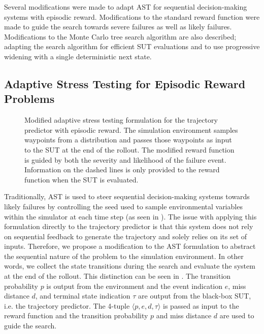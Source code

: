 Several modifications were made to adapt AST for sequential decision-making systems with episodic reward.
Modifications to the standard reward function were made to guide the search towards severe failures as well as likely failures.
Modifications to the Monte Carlo tree search algorithm are also described; adapting the search algorithm for efficient SUT evaluations and to use progressive widening with a single deterministic next state.%


\subsection{Adaptive Stress Testing for Episodic Reward Problems} \label{sec:approach_ast}

\begin{figure*}[!b]
  \centering
  \resizebox{0.95\textwidth}{!}{}
  \caption{
    \label{fig:ast_mdp_modified}
    Modified adaptive stress testing formulation for the trajectory predictor with episodic reward. The simulation environment samples waypoints from a distribution and passes those waypoints as input to the SUT at the end of the rollout.
    The modified reward function is guided by both the severity and likelihood of the failure event. Information on the dashed lines is only provided to the reward function when the SUT is evaluated.
  }
\end{figure*}

Traditionally, AST is used to steer sequential decision-making systems towards likely failures by controlling the seed used to sample environmental variables within the simulator at each time step (as seen in ).
The issue with applying this formulation directly to the trajectory predictor is that this system does not rely on sequential feedback to generate the trajectory and solely relies on its set of inputs. 
Therefore, we propose a modification to the AST formulation to abstract the sequential nature of the problem to the simulation environment.
In other words, we collect the state transitions during the search and evaluate the system at the end of the rollout.
This distinction can be seen in .
The transition probability $p$ is output from the environment and the event indication $e$, miss distance $d$, and terminal state indication $\tau$ are output from the black-box SUT, i.e. the trajectory predictor.
The 4-tuple $\langle p, e, d, \tau \rangle$ is passed as input to the reward function and the transition probability $p$ and miss distance $d$ are used to guide the search.


